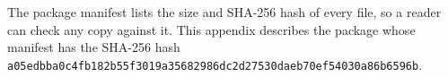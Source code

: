 The package manifest lists the size and SHA-256 hash of every file, so a reader can check any copy against it.
This appendix describes the package whose manifest has the SHA-256 hash \texttt{a05edbba0c4fb182b55f3019a3568298\allowbreak 6dc2d27530daeb70ef54030a86b6596b}.
